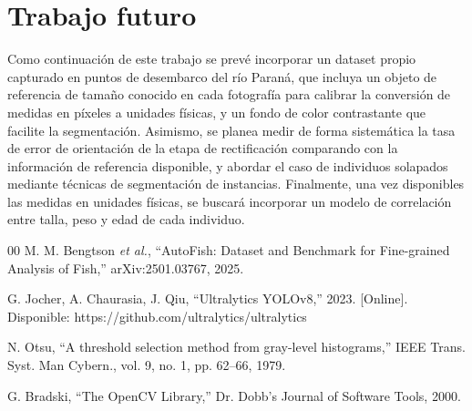 \documentclass[conference]{IEEEtran}
\begin{document}
\section{Trabajo futuro}
Como continuación de este trabajo se prevé incorporar un dataset propio capturado en puntos de desembarco del río Paraná, que incluya un objeto de referencia de tamaño conocido en cada fotografía para calibrar la conversión de medidas en píxeles a unidades físicas, y un fondo de color contrastante que facilite la segmentación. Asimismo, se planea medir de forma sistemática la tasa de error de orientación de la etapa de rectificación comparando con la información de referencia disponible, y abordar el caso de individuos solapados mediante técnicas de segmentación de instancias. Finalmente, una vez disponibles las medidas en unidades físicas, se buscará incorporar un modelo de correlación entre talla, peso y edad de cada individuo.

\begin{thebibliography}{00}
 M. M. Bengtson \emph{et al.}, ``AutoFish: Dataset and Benchmark for Fine-grained Analysis of Fish,'' arXiv:2501.03767, 2025.

 G. Jocher, A. Chaurasia, J. Qiu, ``Ultralytics YOLOv8,'' 2023. [Online]. Disponible: https://github.com/ultralytics/ultralytics

 N. Otsu, ``A threshold selection method from gray-level histograms,'' IEEE Trans. Syst. Man Cybern., vol. 9, no. 1, pp. 62--66, 1979.

 G. Bradski, ``The OpenCV Library,'' Dr. Dobb's Journal of Software Tools, 2000.

\end{thebibliography}
\end{document}
